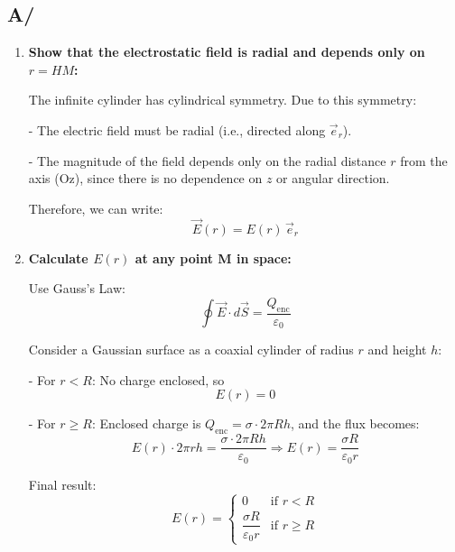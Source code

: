 \documentclass[12pt]{article}
\begin{document}
\newpage

\begin{answerbox}
\subsection*{A/}
    \begin{enumerate}
        \item \textbf{Show that the electrostatic field is radial and depends only on $r = HM$:}
    
            The infinite cylinder has cylindrical symmetry. Due to this symmetry:
            
                
    - The electric field must be radial (i.e., directed along $\vec{e}_r$).
                
    - The magnitude of the field depends only on the radial distance $r$ from the axis (Oz), since there is no dependence on $z$ or angular direction.
            
    
            Therefore, we can write:
            $$
            \vec{E}(r) = E(r)\,\vec{e}_r
            $$
    
        \item \textbf{Calculate $E(r)$ at any point M in space:}
    
            Use Gauss's Law:
            $$
            \oint \vec{E} \cdot d\vec{S} = \frac{Q_{\text{enc}}}{\varepsilon_0}
            $$
    
            Consider a Gaussian surface as a coaxial cylinder of radius $r$ and height $h$:
            
                
    - For $r < R$: No charge enclosed, so
                    $$
                    E(r) = 0
                    $$
                
    - For $r \geq R$: Enclosed charge is $Q_{\text{enc}} = \sigma \cdot 2\pi R h$, and the flux becomes:
                    $$
                    E(r) \cdot 2\pi r h = \frac{\sigma \cdot 2\pi R h}{\varepsilon_0}
                    \Rightarrow E(r) = \frac{\sigma R}{\varepsilon_0 r}
                    $$
            
    
            Final result:
            $$
            E(r) =
            \begin{cases}
                0 & \text{if } r < R \\
                \dfrac{\sigma R}{\varepsilon_0 r} & \text{if } r \geq R
            \end{cases}
            $$
    

\end{enumerate}
\end{answerbox}
\end{document}
